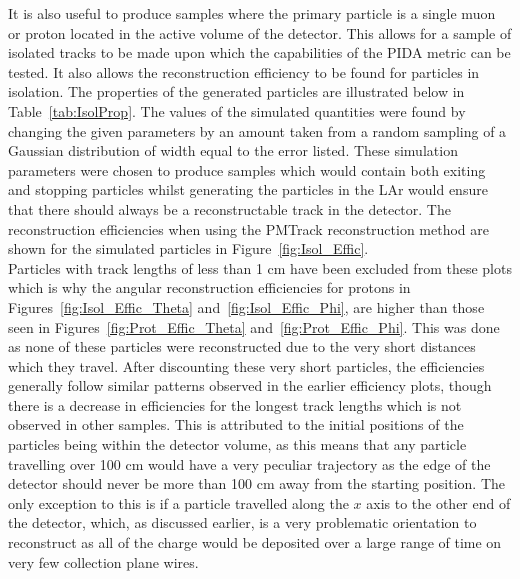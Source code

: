 It is also useful to produce samples where the primary particle is a single muon or proton located in the active volume of the detector. This allows for a sample of isolated tracks to be made upon which the capabilities of the PIDA metric can be tested. It also allows the reconstruction efficiency to be found for particles in isolation. The properties of the generated particles are illustrated below in Table~\ref{tab:IsolProp}. The values of the simulated quantities were found by changing the given parameters by an amount taken from a random sampling of a Gaussian distribution of width equal to the error listed. These simulation parameters were chosen to produce samples which would contain both exiting and stopping particles whilst generating the particles in the LAr would ensure that there should always be a reconstructable track in the detector. The reconstruction efficiencies when using the PMTrack reconstruction method are shown for the simulated particles in Figure~\ref{fig:Isol_Effic}. \\


Particles with track lengths of less than 1 cm have been excluded from these plots which is why the angular reconstruction efficiencies for protons in Figures~\ref{fig:Isol_Effic_Theta} and~\ref{fig:Isol_Effic_Phi}, are higher than those seen in Figures~\ref{fig:Prot_Effic_Theta} and~\ref{fig:Prot_Effic_Phi}. This was done as none of these particles were reconstructed due to the very short distances which they travel. After discounting these very short particles, the efficiencies generally follow similar patterns observed in the earlier efficiency plots, though there is a decrease in efficiencies for the longest track lengths which is not observed in other samples. This is attributed to the initial positions of the particles being within the detector volume, as this means that any particle travelling over 100 cm would have a very peculiar trajectory as the edge of the detector should never be more than 100 cm away from the starting position. The only exception to this is if a particle travelled along the $x$ axis to the other end of the detector, which, as discussed earlier, is a very problematic orientation to reconstruct as all of the charge would be deposited over a large range of time on very few collection plane wires. \\

